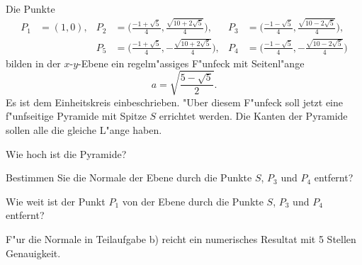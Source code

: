 Die Punkte
\begin{align*}
P_1&=(1,0),
&P_2&=\biggl(\frac{-1+\sqrt{5}}4, \frac{\sqrt{10+2\sqrt{5}}}4 \biggr),
&P_3&=\biggl(\frac{-1-\sqrt{5}}4, \frac{\sqrt{10-2\sqrt{5}}}4 \biggr),\\
&&P_5&=\biggl(\frac{-1+\sqrt{5}}4,-\frac{\sqrt{10+2\sqrt{5}}}4 \biggr),
&P_4&=\biggl(\frac{-1-\sqrt{5}}4,-\frac{\sqrt{10-2\sqrt{5}}}4 \biggr)
\end{align*}
bilden in der $x$-$y$-Ebene ein regelm"assiges F"unfeck mit Seitenl"ange
\[
a=\sqrt{\frac{5-\sqrt{5}}2}.
\]
Es ist dem Einheitskreis einbeschrieben.
"Uber diesem F"unfeck  soll jetzt eine f"unfseitige Pyramide mit
Spitze $S$ errichtet werden.
Die Kanten der Pyramide sollen alle die gleiche L"ange haben.
\begin{teilaufgaben}
\item
Wie hoch ist die Pyramide?
\item
Bestimmen Sie die Normale der Ebene durch die Punkte
$S$, $P_3$ und $P_4$ entfernt?
\item
Wie weit ist der Punkt $P_1$ von der Ebene durch die Punkte
$S$, $P_3$ und $P_4$ entfernt?
\end{teilaufgaben}

\begin{hinweis}
F"ur die Normale in Teilaufgabe b) reicht ein numerisches Resultat
mit 5 Stellen Genauigkeit.
\end{hinweis}



